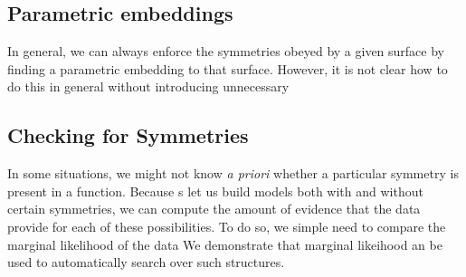 
%


\subsection{Parametric embeddings}

In general, we can always enforce the symmetries obeyed by a given surface by finding a parametric embedding to that surface.  However, it is not clear how to do this in general without introducing unnecessary 





\subsection{Checking for Symmetries}
In some situations, we might not know \emph{a priori} whether a particular symmetry is present in a function.
Because \gp{}s let us build models both with and without certain symmetries, we can compute the amount of evidence that the data provide for each of these possibilities.
To do so, we simple need to compare the marginal likelihood of the data
We demonstrate that marginal likeihood an be used to automatically search over such structures.








